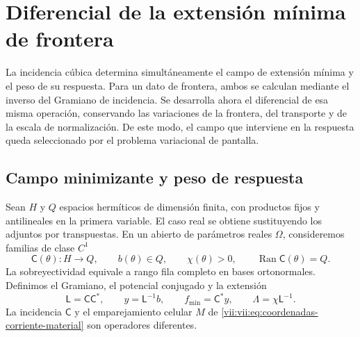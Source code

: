 
\section{Diferencial de la extensión mínima de frontera}
\label{vii:vii:sec:corriente-extension-minima}

La incidencia cúbica determina simultáneamente el campo de extensión
mínima y el peso de su respuesta. Para un dato de frontera, ambos se
calculan mediante el inverso del Gramiano de incidencia. Se desarrolla
ahora el diferencial de esa misma operación, conservando las variaciones
de la frontera, del transporte y de la escala de normalización. De este
modo, el campo que interviene en la respuesta queda seleccionado por
el problema variacional de pantalla.

\subsection{Campo minimizante y peso de respuesta}
\label{vii:vii:subsec:extension-minima-parametrizada}

Sean \(H\) y \(Q\) espacios hermíticos de dimensión finita, con
productos fijos y antilineales en la primera variable. El caso real se
obtiene sustituyendo los adjuntos por transpuestas. En un abierto de
parámetros reales \(\Omega\), consideremos familias de clase \(C^1\)
\[
 \mathsf C(\theta):H\longrightarrow Q,\qquad
 b(\theta)\in Q,\qquad \chi(\theta)>0,
 \qquad \operatorname{Ran}\mathsf C(\theta)=Q.
\]
La sobreyectividad equivale a rango fila completo en bases ortonormales.
Definimos el Gramiano, el potencial conjugado y la extensión
\begin{equation}
 \mathsf L=\mathsf C\mathsf C^*,\qquad
 y=\mathsf L^{-1}b,\qquad f_{\min}=\mathsf C^*y,
 \qquad \Lambda=\chi\mathsf L^{-1}.
 \label{vii:vii:eq:gramiano-extension-minima}
\end{equation}
La incidencia \(\mathsf C\) y el emparejamiento celular \(M\) de
\eqref{vii:vii:eq:coordenadas-corriente-material} son operadores diferentes.

